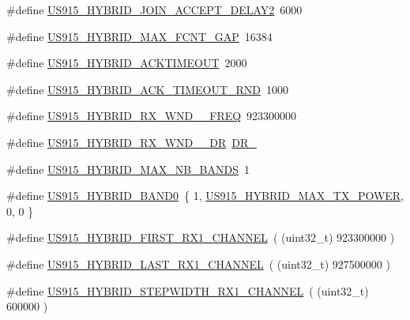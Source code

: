 \begin{DoxyCompactItemize}
\#define \hyperlink{group__REGIONUS915HYB_ga8860ee877a8a686915e64f7ec6180c4a}{U\+S915\+\_\+\+H\+Y\+B\+R\+I\+D\+\_\+\+J\+O\+I\+N\+\_\+\+A\+C\+C\+E\+P\+T\+\_\+\+D\+E\+L\+A\+Y2}~6000
\item 
\#define \hyperlink{group__REGIONUS915HYB_ga905c03a9bea32e6d9afb2117f209dec5}{U\+S915\+\_\+\+H\+Y\+B\+R\+I\+D\+\_\+\+M\+A\+X\+\_\+\+F\+C\+N\+T\+\_\+\+G\+AP}~16384
\item 
\#define \hyperlink{group__REGIONUS915HYB_ga208cfcf431c114e3095c20552f5c0e77}{U\+S915\+\_\+\+H\+Y\+B\+R\+I\+D\+\_\+\+A\+C\+K\+T\+I\+M\+E\+O\+UT}~2000
\item 
\#define \hyperlink{group__REGIONUS915HYB_ga559607e0b707cb0266b55efa2eb38a79}{U\+S915\+\_\+\+H\+Y\+B\+R\+I\+D\+\_\+\+A\+C\+K\+\_\+\+T\+I\+M\+E\+O\+U\+T\+\_\+\+R\+ND}~1000
\item 
\#define \hyperlink{group__REGIONUS915HYB_gae0b62d21f2751fe9c548352e251b41dc}{U\+S915\+\_\+\+H\+Y\+B\+R\+I\+D\+\_\+\+R\+X\+\_\+\+W\+N\+D\+\_\+\_\+\+F\+R\+EQ}~923300000
\item 
\#define \hyperlink{group__REGIONUS915HYB_ga6149ce49b92f289c275a6c6844c38d46}{U\+S915\+\_\+\+H\+Y\+B\+R\+I\+D\+\_\+\+R\+X\+\_\+\+W\+N\+D\+\_\+\_\+\+DR}~\hyperlink{group__REGION_ga44cc96ba80ae464cd9330b784d329c16}{D\+R\+\_}
\item 
\#define \hyperlink{group__REGIONUS915HYB_ga1ddb8622d642ac6254b04f9020ccfcf7}{U\+S915\+\_\+\+H\+Y\+B\+R\+I\+D\+\_\+\+M\+A\+X\+\_\+\+N\+B\+\_\+\+B\+A\+N\+DS}~1
\item 
\#define \hyperlink{group__REGIONUS915HYB_gaf373565fbcca15762d7f9209e78daa6c}{U\+S915\+\_\+\+H\+Y\+B\+R\+I\+D\+\_\+\+B\+A\+N\+D0}~\{ 1, \hyperlink{group__REGIONUS915HYB_ga94a1ed1e5cca1f05f0ac4916e164f529}{U\+S915\+\_\+\+H\+Y\+B\+R\+I\+D\+\_\+\+M\+A\+X\+\_\+\+T\+X\+\_\+\+P\+O\+W\+ER}, 0,  0 \}
\item 
\#define \hyperlink{group__REGIONUS915HYB_ga28e4aa61b58960f8cf317c0d891204f8}{U\+S915\+\_\+\+H\+Y\+B\+R\+I\+D\+\_\+\+F\+I\+R\+S\+T\+\_\+\+R\+X1\+\_\+\+C\+H\+A\+N\+N\+EL}~( (uint32\+\_\+t) 923300000 )
\item 
\#define \hyperlink{group__REGIONUS915HYB_ga27ad9f504f6efe05c69bc1c41cf4ae28}{U\+S915\+\_\+\+H\+Y\+B\+R\+I\+D\+\_\+\+L\+A\+S\+T\+\_\+\+R\+X1\+\_\+\+C\+H\+A\+N\+N\+EL}~( (uint32\+\_\+t) 927500000 )
\item 
\#define \hyperlink{group__REGIONUS915HYB_ga1b77da2ffd6ac645137695b2bccdff08}{U\+S915\+\_\+\+H\+Y\+B\+R\+I\+D\+\_\+\+S\+T\+E\+P\+W\+I\+D\+T\+H\+\_\+\+R\+X1\+\_\+\+C\+H\+A\+N\+N\+EL}~( (uint32\+\_\+t) 600000 )
\end{DoxyCompactItemize}
